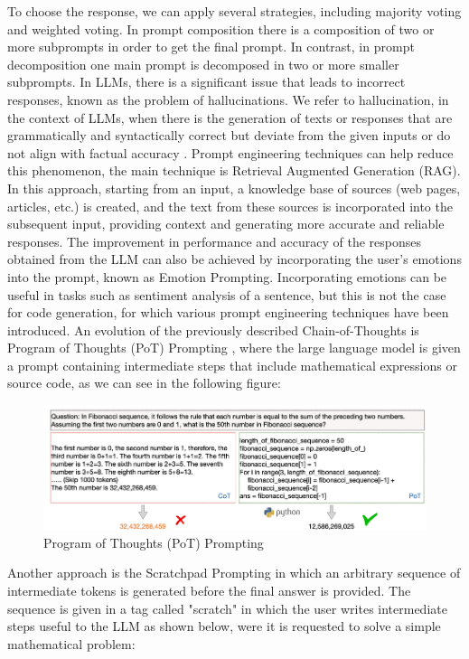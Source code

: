 To choose the response, we can apply several strategies, including majority voting and weighted voting.
In prompt composition there is a composition of two or more subprompts in order to get the final prompt.
In contrast, in prompt decomposition one main prompt is decomposed in two or more smaller subprompts.
In LLMs, there is a significant issue that leads to incorrect responses, known as the problem of hallucinations.
We refer to hallucination, in the context of LLMs, when there is the generation of texts or responses that are grammatically and syntactically correct but deviate from the given inputs or do not align with factual accuracy \cite{ye2023cognitive}.
Prompt engineering techniques can help reduce this phenomenon, the main technique is Retrieval Augmented Generation (RAG).
In this approach, starting from an input, a knowledge base of sources (web pages, articles, etc.) is created, and the text from these sources is incorporated into the subsequent input, providing context and generating more accurate and reliable responses.
The improvement in performance and accuracy of the responses obtained from the LLM can also be achieved by incorporating the user's emotions into the prompt, known as Emotion Prompting.
Incorporating emotions can be useful in tasks such as sentiment analysis of a sentence, but this is not the case for code generation, for which various prompt engineering techniques have been introduced.
An evolution of the previously described Chain-of-Thoughts is Program of Thoughts (PoT) Prompting \cite{chen2022program}, where the large language model is given a prompt containing intermediate steps that include mathematical expressions or source code, as we can see in the following figure:
\begin{figure}[H]
    \centering
    \includegraphics[width=0.7\linewidth]{Figures/fig_8.png}
    \caption{Program of Thoughts (PoT) Prompting}
    \label{fig:enter-label}
\end{figure}
Another approach is the Scratchpad Prompting in which an arbitrary sequence of intermediate tokens is generated before the final answer is provided. 
The sequence is given in a tag called "scratch" \cite{scratch,nye2021show} in which the user writes intermediate steps useful to the LLM as shown below, were it is requested to solve a simple mathematical problem:
